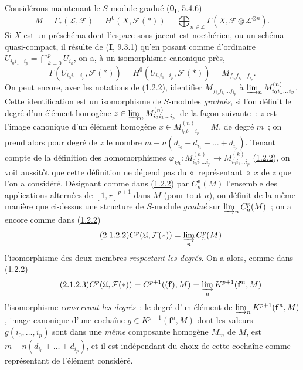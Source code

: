 \begin{env}[2.1.2]
\label{III.2.1.2-fr}
Considérons maintenant le $S$-module gradué (\textbf{0}\textsubscript{I}, 5.4.6)
\begin{equation}
\label{III.2.1.2.1-fr}
\tag{2.1.2.1}
M=\Gamma_*(\mathcal L,\mathcal F)
=H^0(X,\mathcal F(*))
=\bigoplus_{n\in\mathbb Z}
\Gamma(X,\mathcal F\otimes\mathcal L^{\otimes n}).
\end{equation}
Si $X$ est un préschéma dont l'espace sous-jacent est noethérien, ou un
schéma quasi-compact, il résulte de (\textbf{I}, 9.3.1) qu'en posant comme d'ordinaire
$U_{i_0i_1\ldots i_p}=\bigcap_{k=0}^pU_{i_k}$, on a, à un isomorphisme
canonique près,
\[
\Gamma(U_{i_0i_1\ldots i_p},\mathcal F(*))
=H^0(U_{i_0i_1\ldots i_p},\mathcal F(*))
=M_{f_{i_0}f_{i_1}\ldots f_{i_p}}.
\]
On peut encore, avec les notations de
(\hyperref[III.1.2.2-fr]{1.2.2}), identifier
$M_{f_{i_0}f_{i_1}\ldots f_{i_p}}$ à
$\varinjlim_n M_{i_0i_1\ldots i_p}^{(n)}$. Cette identification est un
isomorphisme de $S$-modules \emph{gradués}, si l'on définit le degré d'un élément
homogène $z\in\varinjlim_n M_{i_0i_1\ldots i_p}^{(n)}$ de la façon
suivante~: $z$ est l'image canonique d'un élément homogène
$x\in M_{i_0i_1\ldots i_p}^{(n)}=M$, de degré $m$~; on prend alors pour
degré de $z$ le nombre
$m-n(d_{i_0}+d_{i_1}+\ldots+d_{i_p})$. Tenant compte de la définition des
homomorphismes
$\varphi_{kh}:M_{i_0i_1\ldots i_p}^{(h)}\to
M_{i_0i_1\ldots i_p}^{(k)}$ (\hyperref[III.1.2.2-fr]{1.2.2}), on voit
aussitôt que cette définition ne dépend pas du «~représentant~» $x$ de $z$
que l'on a considéré. Désignant comme dans
(\hyperref[III.1.2.2-fr]{1.2.2}) par $C_n^p(M)$ l'ensemble des applications
alternées de $[1,r]^{p+1}$ dans $M$ (pour tout $n$), on définit de la même
manière que ci-dessus une structure de $S$-module \emph{gradué} sur
$\varinjlim_n C_n^p(M)$~; on a encore comme dans
(\hyperref[III.1.2.2-fr]{1.2.2})
\begin{equation}
\label{III.2.1.2.2-fr}
\tag{2.1.2.2}
C^p(\mathfrak U,\mathcal F(*))=\varinjlim_n C_n^p(M)
\end{equation}
l'isomorphisme des deux membres \emph{respectant les degrés}. On a alors,
comme dans (\hyperref[III.1.2.2-fr]{1.2.2})
\begin{equation}
\label{III.2.1.2.3-fr}
\tag{2.1.2.3}
C^p(\mathfrak U,\mathcal F(*))
=C^{p+1}((\mathbf f),M)
=\varinjlim_n K^{p+1}(\mathbf f^n,M)
\end{equation}
l'isomorphisme \emph{conservant les degrés}~: le degré d'un élément de
$\varinjlim_n K^{p+1}(\mathbf f^n,M)$, image canonique d'une cochaîne
$g\in K^{p+1}(\mathbf f^n,M)$ dont les valeurs
$g(i_0,\ldots,i_p)$ sont dans une \emph{même} composante homogène $M_m$ de $M$,
est $m-n(d_{i_0}+\ldots+d_{i_p})$, et il est indépendant du choix de cette
cochaîne comme représentant de l'élément considéré.
\end{env}

